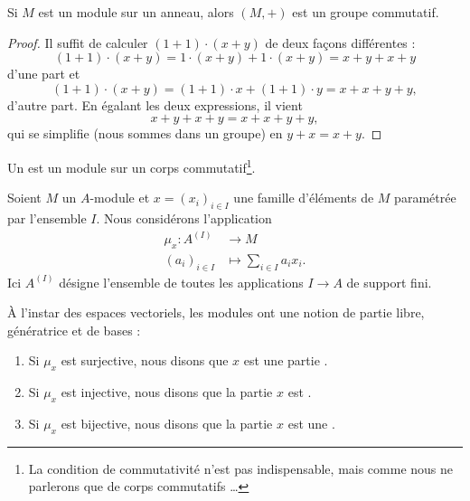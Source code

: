 \begin{proposition}\label{PROPooGARGooDiMqtN}
    Si \( M\) est un module sur un anneau, alors \( (M,+)\) est un groupe commutatif.
\end{proposition}

\begin{proof}
    Il suffit de calculer \( (1+1)\cdot (x+y)\) de deux façons différentes :
    \begin{equation}
        (1+1)\cdot (x+y)=1\cdot (x+y)+1\cdot (x+y)=x+y+x+y
    \end{equation}
    d'une part et
    \begin{equation}
        (1+1)\cdot (x+y)=(1+1)\cdot x+(1+1)\cdot y=x+x+y+y,
    \end{equation}
    d'autre part. En égalant les deux expressions, il vient 
    \begin{equation}
        x+y+x+y=x+x+y+y,
    \end{equation}
    qui se simplifie (nous sommes dans un groupe) en \( y+x=x+y\).
\end{proof}

\begin{definition}\label{DEFooKHWZooIfxdNc}
    Un  est un module sur un corps commutatif\footnote{La condition de commutativité n'est pas indispensable, mais comme nous ne parlerons que de corps commutatifs \ldots}.
\end{definition}

Soient \( M\) un \( A\)-module et \( x=(x_i)_{i\in I}\) une famille d'éléments de \( M\) paramétrée par l'ensemble \( I\). Nous considérons l'application
\begin{equation}
    \begin{aligned}
        \mu_x\colon A^{(I)}&\to M \\
        (a_i)_{i\in I}&\mapsto \sum_{i\in I}a_ix_i.
    \end{aligned}
\end{equation}
Ici \( A^{(I)}\) désigne l'ensemble de toutes les applications \( I\to A\) de support fini.  

\begin{definition}      \label{DefBasePouyKj}
    À l'instar des espaces vectoriels, les modules ont une notion de partie libre, génératrice et de bases :
    \begin{enumerate}
        \item
            Si \( \mu_x\) est surjective, nous disons que \( x\) est une partie .
        \item
            Si \( \mu_x\) est injective, nous disons que la partie \( x\) est .
        \item
            Si \( \mu_x\) est bijective, nous disons que la partie \( x\) est une .
    \end{enumerate}
\end{definition}

